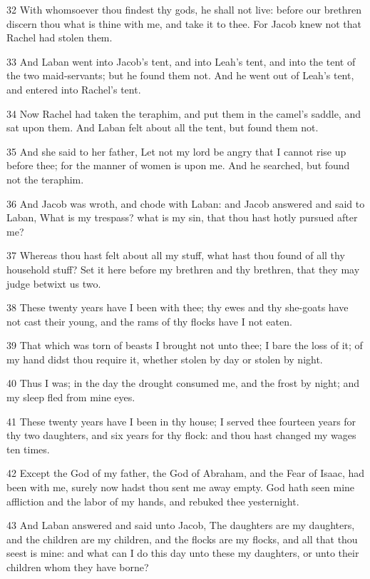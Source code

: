 \par 32 With whomsoever thou findest thy gods, he shall not live: before our brethren discern thou what is thine with me, and take it to thee. For Jacob knew not that Rachel had stolen them.
\par 33 And Laban went into Jacob's tent, and into Leah's tent, and into the tent of the two maid-servants; but he found them not. And he went out of Leah's tent, and entered into Rachel's tent.
\par 34 Now Rachel had taken the teraphim, and put them in the camel's saddle, and sat upon them. And Laban felt about all the tent, but found them not.
\par 35 And she said to her father, Let not my lord be angry that I cannot rise up before thee; for the manner of women is upon me. And he searched, but found not the teraphim.
\par 36 And Jacob was wroth, and chode with Laban: and Jacob answered and said to Laban, What is my trespass? what is my sin, that thou hast hotly pursued after me?
\par 37 Whereas thou hast felt about all my stuff, what hast thou found of all thy household stuff? Set it here before my brethren and thy brethren, that they may judge betwixt us two.
\par 38 These twenty years have I been with thee; thy ewes and thy she-goats have not cast their young, and the rams of thy flocks have I not eaten.
\par 39 That which was torn of beasts I brought not unto thee; I bare the loss of it; of my hand didst thou require it, whether stolen by day or stolen by night.
\par 40 Thus I was; in the day the drought consumed me, and the frost by night; and my sleep fled from mine eyes.
\par 41 These twenty years have I been in thy house; I served thee fourteen years for thy two daughters, and six years for thy flock: and thou hast changed my wages ten times.
\par 42 Except the God of my father, the God of Abraham, and the Fear of Isaac, had been with me, surely now hadst thou sent me away empty. God hath seen mine affliction and the labor of my hands, and rebuked thee yesternight.
\par 43 And Laban answered and said unto Jacob, The daughters are my daughters, and the children are my children, and the flocks are my flocks, and all that thou seest is mine: and what can I do this day unto these my daughters, or unto their children whom they have borne?
